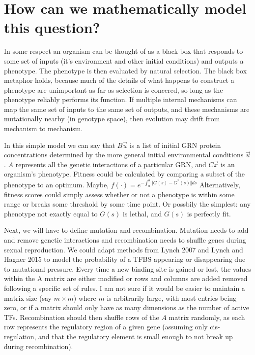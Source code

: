 \documentclass[a4paper, 11 pt]{article}
\begin{document}
\section{How can we mathematically model this question?}
In some respect an organism can be thought of as a black box that responds to some set of inputs (it's environment and other initial conditions) and outputs a phenotype. The phenotype is then evaluated by natural selection. The black box metaphor holds, because much of the details of what happens to construct a phenotype are unimportant as far as selection is concered, so long as the phenotype reliably performs its function. If multiple internal mechanisms can map the same set of inputs to the same set of outputs, and these mechanisms are mutationally nearby (in genotype space), then evolution may drift from mechanism to mechanism. 

In this simple model we can say that $B\vec{u}$ is a list of initial GRN protein concentrations determined by the more general initial environmental conditions $\vec{u}$. $A$ represents all the genetic interactions of a particular GRN, and $C\vec{x}$ is an organism's phenotype. Fitness could be calculated by comparing a subset of the phenotype to an optimum. Maybe, $f(\cdot) = e^{- \int_{a}^{b} \Vert G(s) - G^{*}(s) \Vert ds}$ Alternatively, fitness scores could simply assess whether or not a phenotype is within some range or breaks some threshold by some time point. Or possbily the simplest: any phenotype not exactly equal to $G(s)$ is lethal, and $G(s)$ is perfectly fit. 

Next, we will have to define mutation and recombination. Mutation needs to add and remove genetic interactions and recombination needs to shuffle genes during sexual reproduction. We could adapt methods from Lynch 2007 and Lynch and Hagner 2015 to model the probability of a TFBS appearing or disappearing due to mutational pressure. Every time a new binding site is gained or lost, the values within the A matrix are either modified or rows and columns are added removed following a specific set of rules. I am not sure if it would be easier to maintain a matrix size (say $m \times m$) where $m$ is arbitrarily large, with  most entries being zero, or if a matrix should only have as many dimensions as the number of active TFs. Recombination should then shuffle rows of the $A$ matrix randomly, as each row represents the regulatory region of a given gene (assuming only cis-regulation, and that the regulatory element is small enough to not break up during recombination).  
\end{document}
